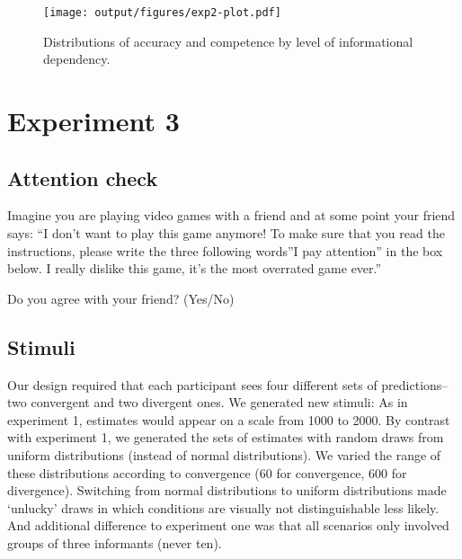 \documentclass[
  doc,floatsintext]{apa6}
\begin{document}
\begin{figure}
\centering
\texttt{[image: output/figures/exp2-plot.pdf]}
\caption{\label{fig:exp2-plot}Distributions of accuracy and competence by level of informational dependency.}
\end{figure}

\clearpage

\section{Experiment 3}\label{exp3}

\FloatBarrier

\subsection{Attention check}\label{attention-check-2}

Imagine you are playing video games with a friend and at some point your friend says: ``I don't want to play this game anymore! To make sure that you read the instructions, please write the three following words''I pay attention'' in the box below. I really dislike this game, it's the most overrated game ever.''

Do you agree with your friend? (Yes/No)

\subsection{Stimuli}\label{stimuli-1}

Our design required that each participant sees four different sets of predictions--two convergent and two divergent ones. We generated new stimuli: As in experiment 1, estimates would appear on a scale from 1000 to 2000. By contrast with experiment 1, we generated the sets of estimates with random draws from uniform distributions (instead of normal distributions). We varied the range of these distributions according to convergence (60 for convergence, 600 for divergence). Switching from normal distributions to uniform distributions made `unlucky' draws in which conditions are visually not distinguishable less likely. And additional difference to experiment one was that all scenarios only involved groups of three informants (never ten).
\end{document}
